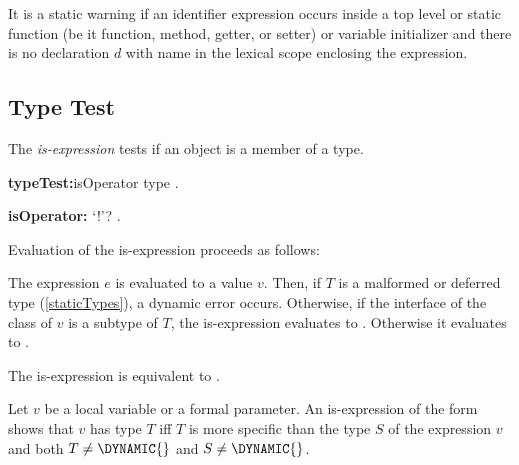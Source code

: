 \documentclass{article}
\begin{document}


\LMHash{}
It is a static warning if an identifier expression \id{} occurs inside a top level or static function (be it function, method, getter, or setter) or variable initializer and there is no declaration $d$ with name \id{} in the lexical scope enclosing the expression.


\subsection{Type Test}

\LMHash{}
The {\em is-expression} tests if an object is a member of a type.

\begin{grammar}
{\bf typeTest:}isOperator type
  .

{\bf isOperator:}\IS{} `!'?
  .
\end{grammar}

\LMHash{}
Evaluation of the is-expression  proceeds as follows:

\LMHash{}
The expression $e$ is evaluated to a value $v$.
Then, if $T$ is a malformed or deferred type (\ref{staticTypes}), a dynamic error occurs.
Otherwise, if the interface of the class of $v$ is a subtype of $T$, the is-expression evaluates to \TRUE.
Otherwise it evaluates to \FALSE.


\LMHash{}
The is-expression  is equivalent to .


\LMHash{}
Let $v$ be a local variable or a formal parameter.
An is-expression of the form  shows that $v$ has type $T$ if{}f $T$ is more specific than the type $S$ of the expression $v$ and both $T \ne \DYNAMIC{}$ and $S \ne \DYNAMIC{}$.
\end{document}
